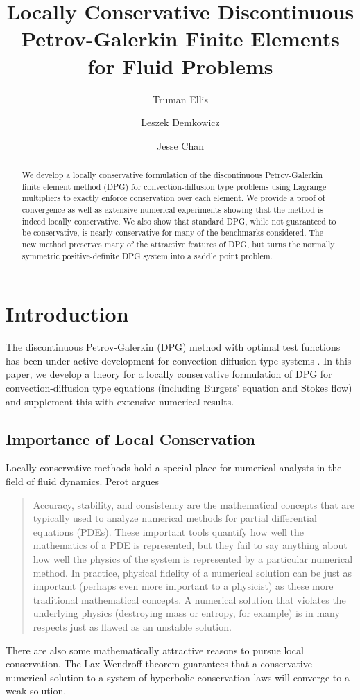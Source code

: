 \documentclass[letterpaper]{article}
\title{Locally Conservative Discontinuous Petrov-Galerkin Finite Elements for
Fluid Problems}
\author{Truman Ellis}
\author{Leszek Demkowicz}
\author{Jesse Chan}
\affil{Institute for Computational Engineering and Sciences,\\
The University of Texas at Austin, \\
Austin, TX 78712}
\date{}
\begin{document}
\maketitle

\begin{abstract}
We develop a locally conservative formulation of the discontinuous
Petrov-Galerkin finite element method (DPG) for convection-diffusion type
problems using Lagrange multipliers to exactly enforce conservation over each
element. We provide a proof of convergence as well as extensive numerical
experiments showing that the method is indeed locally conservative. We also
show that standard DPG, while not guaranteed to be conservative, is nearly
conservative for many of the benchmarks considered. The new method preserves many of
the attractive features of DPG, but turns the normally symmetric
positive-definite DPG system into a saddle point problem.
\end{abstract}

\section{Introduction}
The discontinuous Petrov-Galerkin (DPG) method with optimal test functions has
been under active development for convection-diffusion type systems
\cite{DPG1, DPG2, DPG3, DPG5, DemkowiczHeuer, ChanHeuerThanhDemkowicz2012,
MoroNguyenPeraire11, Chan2013DPG, NateDissertation}. In this paper, we develop a theory for a locally
conservative formulation of DPG for convection-diffusion type equations
(including Burgers' equation and Stokes flow) and supplement this with
extensive numerical results.

\subsection{Importance of Local Conservation}
Locally conservative methods hold a special place for numerical analysts in
the field of fluid dynamics.
Perot\cite{Perot2011} argues
\begin{quote}
Accuracy, stability, and consistency are the mathematical concepts that are
typically used to analyze numerical methods for partial differential equations
(PDEs). These important tools quantify how well the mathematics of a PDE is
represented, but they fail to say anything about how well the physics of the
system is represented by a particular numerical method. In practice, physical
fidelity of a numerical solution can be just as important (perhaps even more
important to a physicist) as these more traditional mathematical concepts. A
numerical solution that violates the underlying physics (destroying mass or
entropy, for example) is in many respects just as flawed as an unstable
solution.
\end{quote}
There are also some mathematically attractive reasons to pursue local
conservation. The Lax-Wendroff theorem guarantees that a conservative numerical
solution to a system of hyperbolic conservation laws will converge to a
weak solution.
\end{document}

